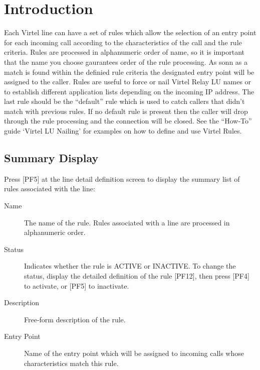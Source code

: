 \documentclass[letterpaper,10pt,english]{sphinxmanual}
\begin{document}
\section{Introduction}
\label{\detokenize{connectivity_guide:id43}}
Each Virtel line can have a set of rules which allow the selection of an entry point for each incoming call according to the characteristics of the call and the rule criteria. Rules are processed in alphanumeric order of name, so it is important that the name you choose gaurantees order of the rule processing. As sonn as a match is found within the definied rule criteria the designated entry point will be assigned to the caller. Rules are useful to force or nail Virtel Relay LU names or to establish different application lists depending on the incoming IP address. The last rule should be the “default” rule which is used to catch callers that didn’t match with previous rules. If no default rule is present then the caller will drop through the rule processing and the connection will be closed. See the “How-To” guide ‘Virtel LU Nailing’ for examples on how to define and use Virtel Rules.


\subsection{Summary Display}
\label{\detokenize{connectivity_guide:id44}}\label{\detokenize{connectivity_guide:index-91}}
Press {[}PF5{]} at the line detail definition screen to display the summary list of rules associated with the line:


\begin{description}
\item[{Name}] \leavevmode
The name of the rule. Rules associated with a line are processed in alphanumeric order.

\item[{Status}] \leavevmode
Indicates whether the rule is ACTIVE or INACTIVE. To change the status, display the detailed definition of the rule {[}PF12{]}, then press {[}PF4{]} to activate, or {[}PF5{]} to inactivate.

\item[{Description}] \leavevmode
Free-form description of the rule.

\item[{Entry Point}] \leavevmode
Name of the entry point which will be assigned to incoming calls whose characteristics match this rule.

\end{description}
\end{document}
